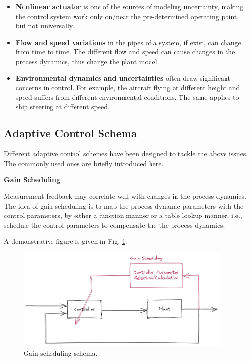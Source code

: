 \begin{itemize}
	\item \textbf{Nonlinear actuator} is one of the sources of modeling uncertainty, making the control system work only on/near the pre-determined operating point, but not universally.
	\item \textbf{Flow and speed variations} in the pipes of a system, if exist, can change from time to time. The different flow and speed can cause changes in the process dynamics, thus change the plant model.
	\item \textbf{Environmental dynamics and uncertainties} often draw significant concerns in control. For example, the aircraft flying at different height and speed suffers from different environmental conditions. The same applies to ship steering at different speed.
\end{itemize}

\subsection{Adaptive Control Schema}

Different adaptive control schemes have been designed to tackle the above issues. The commonly used ones are briefly introduced here.

\vspace{0.1in}
\noindent \textbf{Gain Scheduling}
\vspace{0.1in}

Measurement feedback may correlate well with changes in the process dynamics. The idea of gain scheduling is to map the process dynamic parameters with the control parameters, by either a function manner or a table lookup manner, i.e., schedule the control parameters to compensate the the process dynamics.

A demonstrative figure is given in Fig. \ref{ch:acs:fig:gain_scheduling_schema}.

\begin{figure}
	\centering
	\includegraphics[width=300pt]{chapters/ch-adaptive-control-system/figures/gain_scheduling_schema.png}
	\caption{Gain scheduling schema.} \label{ch:acs:fig:gain_scheduling_schema}
\end{figure}

